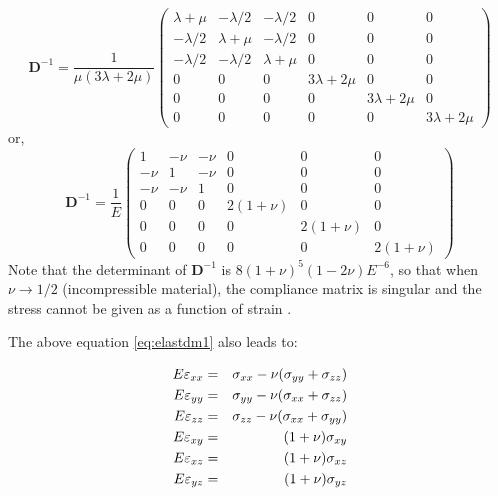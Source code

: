 \[
{\bm D}^{-1}
=
\frac{1}{\mu(3\lambda+2\mu)}
\left(
\begin{array}{cccccc}
\lambda+\mu & -\lambda/2 & -\lambda/2 & 0 & 0 & 0 \\
-\lambda/2 & \lambda+\mu & -\lambda/2 & 0 & 0 & 0 \\
-\lambda/2 & -\lambda/2 & \lambda+\mu & 0 & 0 & 0 \\
0 & 0 & 0 & 3\lambda+2\mu & 0 & 0 \\ 
0 & 0 & 0 & 0 & 3\lambda+2\mu & 0 \\ 
0 & 0 & 0 & 0 & 0 & 3\lambda+2\mu  
\end{array}
\right)
\]
or,
\begin{equation}
{\bm D}^{-1}
= \frac{1}{E}
\left(
\begin{array}{cccccc}
1 & -\nu & -\nu & 0 & 0 & 0 \\
-\nu & 1 & -\nu & 0 & 0 & 0 \\
-\nu & -\nu & 1 & 0 & 0 & 0 \\
0 & 0 & 0 & 2(1+\nu) & 0 & 0 \\ 
0 & 0 & 0 & 0 & 2(1+\nu) & 0 \\ 
0 & 0 & 0 & 0 & 0 & 2(1+\nu) 
\end{array}
\right)
\label{eq:elastdm1}
\end{equation}
Note that the determinant  of ${\bm D}^{-1}$ is $8(1+\nu)^5(1-2\nu)E^{-6}$, 
so that when $\nu\rightarrow 1/2$ (incompressible material), the compliance 
matrix is singular and the stress cannot be given as a function of 
strain \cite{lubliner}.

The above equation \eqref{eq:elastdm1} also leads to:
\begin{mdframed}[backgroundcolor=blue!5]
\begin{eqnarray}
E \varepsilon_{xx} &=&  \sigma_{xx} - \nu (\sigma_{yy}+\sigma_{zz}) \nonumber\\
E \varepsilon_{yy} &=&  \sigma_{yy} - \nu (\sigma_{xx}+\sigma_{zz}) \nonumber\\
E \varepsilon_{zz} &=&  \sigma_{zz} - \nu (\sigma_{xx}+\sigma_{yy}) \nonumber\\
E \varepsilon_{xy} &=&  (1+\nu) \sigma_{xy} \nonumber\\
E \varepsilon_{xz} &=&  (1+\nu) \sigma_{xz} \nonumber\\
E \varepsilon_{yz} &=&  (1+\nu) \sigma_{yz} \label{eqs:elEe}
\end{eqnarray}
\end{mdframed}

